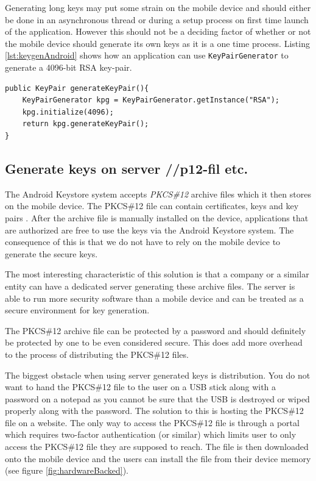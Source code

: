 Generating long keys may put some strain on the mobile device and should either be done in an asynchronous thread or during a setup process on first time launch of the application. However this should not be a deciding factor of whether or not the mobile device should generate its own keys as it is a one time process. Listing \ref{lst:keygenAndroid} shows how an application can use \texttt{KeyPairGenerator} to generate a 4096-bit RSA key-pair.

\begin{lstlisting}[caption=Generating RSA key-pair on Android device using KeyPairGenerator, label=lst:keygenAndroid,escapechar=å]
public KeyPair generateKeyPair(){
    KeyPairGenerator kpg = KeyPairGenerator.getInstance("RSA");
    kpg.initialize(4096);
    return kpg.generateKeyPair();
}
\end{lstlisting}

\subsection{Generate keys on server //p12-fil etc.}
\label{sec:generateKeysOnServer}
The Android Keystore system accepts \textit{PKCS\#12} archive files which it then stores on the mobile device. The PKCS\#12 file can contain certificates, keys and key pairs \cite{pkcs12}. After the archive file is manually installed on the device, applications that are authorized are free to use the keys via the Android Keystore system. The consequence of this is that we do not have to rely on the mobile device to generate the secure keys.

The most interesting characteristic of this solution is that a company or a similar entity can have a dedicated server generating these archive files. The server is able to run more security software than a mobile device and can be treated as a secure environment for key generation.

The PKCS\#12 archive file can be protected by a password and should definitely be protected by one to be even considered secure. This does add more overhead to the process of distributing the PKCS\#12 files.

The biggest obstacle when using server generated keys is distribution. You do not want to hand the PKCS\#12 file to the user on a USB stick along with a password on a notepad as you cannot be sure that the USB is destroyed or wiped properly along with the password. The solution to this is hosting the PKCS\#12 file on a website. The only way to access the PKCS\#12 file is through a portal which requires two-factor authentication (or similar) which limits user to only access the PKCS\#12 file they are supposed to reach. The file is then downloaded onto the mobile device and the users can install the file from their device memory (see figure \ref{fig:hardwareBacked}).


